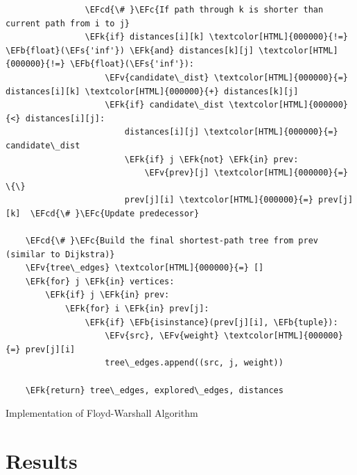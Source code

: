 \documentclass[a4paper,12pt]{article}
\newcommand{\EFc}[1]{\textcolor{EFc}{#1}} %
\newcommand{\EFcd}[1]{\textcolor{EFcd}{#1}} %
\newcommand{\EFs}[1]{\textcolor{EFs}{#1}} %
\newcommand{\EFk}[1]{\textcolor{EFk}{#1}} %
\newcommand{\EFb}[1]{\textcolor{EFb}{#1}} %
\newcommand{\EFv}[1]{\textcolor{EFv}{#1}} %
\begin{document}
\begin{listing}[htbp]
\begin{Code}
\begin{Verbatim}
                \EFcd{\# }\EFc{If path through k is shorter than current path from i to j}
                \EFk{if} distances[i][k] \textcolor[HTML]{000000}{!=} \EFb{float}(\EFs{'inf'}) \EFk{and} distances[k][j] \textcolor[HTML]{000000}{!=} \EFb{float}(\EFs{'inf'}):
                    \EFv{candidate\_dist} \textcolor[HTML]{000000}{=} distances[i][k] \textcolor[HTML]{000000}{+} distances[k][j]
                    \EFk{if} candidate\_dist \textcolor[HTML]{000000}{<} distances[i][j]:
                        distances[i][j] \textcolor[HTML]{000000}{=} candidate\_dist
                        \EFk{if} j \EFk{not} \EFk{in} prev:
                            \EFv{prev}[j] \textcolor[HTML]{000000}{=} \{\}
                        prev[j][i] \textcolor[HTML]{000000}{=} prev[j][k]  \EFcd{\# }\EFc{Update predecessor}

    \EFcd{\# }\EFc{Build the final shortest-path tree from prev (similar to Dijkstra)}
    \EFv{tree\_edges} \textcolor[HTML]{000000}{=} []
    \EFk{for} j \EFk{in} vertices:
        \EFk{if} j \EFk{in} prev:
            \EFk{for} i \EFk{in} prev[j]:
                \EFk{if} \EFb{isinstance}(prev[j][i], \EFb{tuple}):
                    \EFv{src}, \EFv{weight} \textcolor[HTML]{000000}{=} prev[j][i]
                    tree\_edges.append((src, j, weight))

    \EFk{return} tree\_edges, explored\_edges, distances
\end{Verbatim}
\end{Code}
\caption{\label{lst:orgd5effaa}Implementation of Floyd-Warshall Algorithm}
\end{listing}
\section{Results}
\label{sec:org20909a8}
\end{document}
